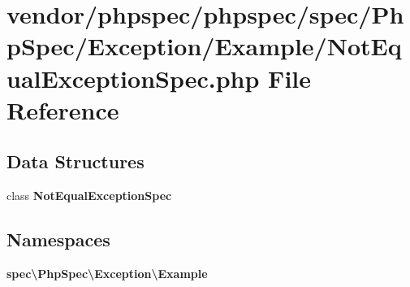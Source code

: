 \section{vendor/phpspec/phpspec/spec/\+Php\+Spec/\+Exception/\+Example/\+Not\+Equal\+Exception\+Spec.php File Reference}
\label{_not_equal_exception_spec_8php}
\subsection*{Data Structures}
\begin{DoxyCompactItemize}
\item 
class {\bf Not\+Equal\+Exception\+Spec}
\end{DoxyCompactItemize}
\subsection*{Namespaces}
\begin{DoxyCompactItemize}
\item 
 {\bf spec\textbackslash{}\+Php\+Spec\textbackslash{}\+Exception\textbackslash{}\+Example}
\end{DoxyCompactItemize}
